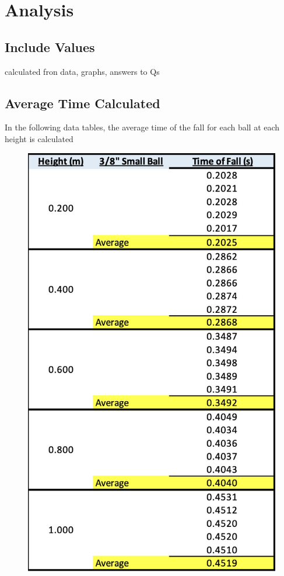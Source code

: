 \chapter{Analysis}
\section{Include Values}
calculated fron data, graphs, answers to Qs

\section{Average Time Calculated}
In the following data tables, the average time of the fall for each ball at 
each height is calculated

\begin{figure}[!h]
  \begin{minipage}{0.45\textwidth}
    \centering
    \includegraphics[scale=0.39]{resources/SmallTableAverage.jpg}

\end{minipage}
\end{figure}
